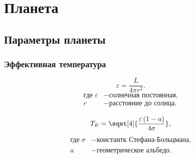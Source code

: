 \section{Планета}

\subsection{Параметры планеты}

\subsubsection{Эффективная температура}
\begin{equation}
	\varepsilon = \frac{L}{4\pi r^2}.
\end{equation}
\begin{align*}
	\text{где}\;  
	\varepsilon & - \text{солнечная постоянная,}\\
	r & - \text{расстояние до солнца.}
\end{align*}

\begin{equation}
	T_E = \sqst[4]{\frac{\varepsilon \left( 1- a \right) }{4\sigma}},
\end{equation}
\begin{align*}
	\text{где}\;  
	\sigma & - \text{константк Стефана-Больцмана,}\\
	a & - \text{геометрическое альбедо.}
\end{align*}
